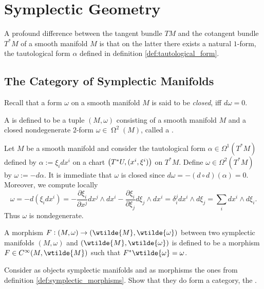 \section*{Symplectic Geometry}
A profound difference between the tangent bundle $TM$ and the cotangent bundle $T^*M$ of a smooth manifold $M$ is that on the latter there exists a natural $1$-form, the tautological form $\alpha$ defined in definition \ref{def:tautological_form}.  

\subsection*{The Category of Symplectic Manifolds}
Recall that a form $\omega$ on a smooth manifold $M$ is said to be \emph{closed}, iff $d\omega = 0$.

\begin{definition}
	A  is defined to be a tuple $(M,\omega)$ consisting of a smooth manifold $M$ and a closed nondegenerate $2$-form $\omega \in \upOmega^2(M)$, called a .
\end{definition}

\begin{example}
	\label{ex:cotangent_bundle}
	Let $M$ be a smooth manifold and consider the tautological form $\alpha \in \Omega^1(T^*M)$ defined by $\alpha := \xi_i dx^i$ on a chart $\del[1]{T^*U, (x^i,\xi^i)}$ on $T^*M$. Define $\omega \in \Omega^2(T^*M)$ by $\omega := -d\alpha$. It is immediate that $\omega$ is closed since $d\omega = -(d \circ d)(\alpha) = 0$. Moreover, we compute locally
	\begin{equation*}
		\omega = -d(\xi_idx^i) = -\frac{\partial \xi_i}{\partial x^j} dx^j \wedge dx^i - \frac{\partial \xi_i}{\partial \xi_j} d\xi_j \wedge dx^i = \delta^j_i dx^i \wedge d\xi_j = \sum_i dx^i \wedge d\xi_i.
	\end{equation*}
	Thus $\omega$ is nondegenerate. 
\end{example}

\begin{definition}
	\label{def:symplectic_morphisms}
	A morphism $F : (M,\omega) \to (\wtilde{M},\wtilde{\omega})$ between two symplectic manifolds $(M,\omega)$ and $(\wtilde{M},\wtilde{\omega})$ is defined to be a morphism $F \in C^\infty(M,\wtilde{M})$ such that $F^*\wtilde{\omega} = \omega$. 
\end{definition}

\begin{exercise}
	Consider as objects symplectic manifolds and as morphisms the ones from definition \ref{def:symplectic_morphisms}. Show that they do form a category, the .
\end{exercise}

